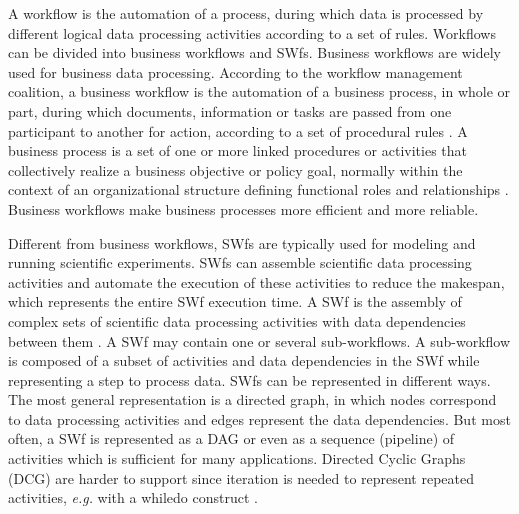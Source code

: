 A workflow is the automation of a process, during which data is processed
by different logical data processing activities according to a set
of rules. Workflows can be divided into business workflows and SWfs. Business workflows are widely used for business data processing.
According to the workflow management coalition, a business workflow
is the automation of a business process, in whole or part, during
which documents, information or tasks are passed from one participant
to another for action, according to a set of procedural rules \cite{Coalition1999}.
A business process is a set of one or more linked procedures or activities
that collectively realize a business objective or policy goal, normally
within the context of an organizational structure defining functional
roles and relationships \cite{Coalition1999}. Business workflows
make business processes more efficient and more reliable.

Different from business workflows, SWfs are typically
used for modeling and running scientific experiments. SWfs
can assemble scientific data processing activities and automate the
execution of these activities to reduce the makespan, which represents
the entire SWf execution time. A SWf is the assembly
of complex sets of scientific data processing activities with data
dependencies between them \cite{Deelman2009}. 
A SWf may contain one or several sub-workflows. A sub-workflow is composed of a subset of activities and data dependencies in the SWf while representing a step to process data.
SWfs can be represented in different ways. The most general representation
is a directed graph, in which nodes correspond to data processing
activities and edges represent the data dependencies.
But most often, a SWf is represented as a DAG or
even as a sequence (pipeline) of activities which is sufficient for
many applications.
Directed Cyclic Graphs (DCG) are harder to support since iteration is needed to represent repeated
activities, \textit{e.g.} with a whiledo construct \cite{Yu2005}.

